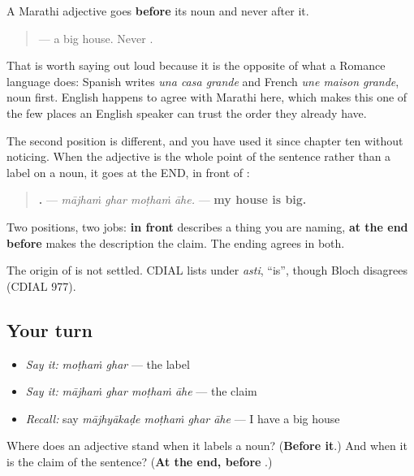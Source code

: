 \begin{grammarlens}[title={Grammar Lens: in front, always}]
A Marathi adjective goes \textbf{before} its noun and never after it.

\begin{quote}
\textbf{ } — a big house. Never \emph{ }.
\end{quote}

That is worth saying out loud because it is the opposite of what a Romance language does: Spanish writes \emph{una casa grande} and French \emph{une maison grande}, noun first. English happens to agree with Marathi here, which makes this one of the few places an English speaker can trust the order they already have.

The second position is different, and you have used it since chapter ten without noticing. When the adjective is the whole point of the sentence rather than a label on a noun, it goes at the END, in front of \textbf{}:

\begin{quote}
\textbf{   .} — \emph{mājhaṁ ghar moṭhaṁ āhe.} — \textbf{my house is big.}
\end{quote}

Two positions, two jobs: \textbf{in front} describes a thing you are naming, \textbf{at the end before } makes the description the claim. The ending agrees in both.
\end{grammarlens}

\begin{cousinweb}
The origin of \textbf{} is not settled. \textbf{} CDIAL lists under \emph{asti}, \textquotedblleft{}is\textquotedblright{}, though Bloch disagrees (CDIAL 977).
\end{cousinweb}

\subsection*{Your turn}
\begin{itemize}
\raggedright
  \item \emph{Say it:} \emph{moṭhaṁ ghar} — the label
  \item \emph{Say it:} \emph{mājhaṁ ghar moṭhaṁ āhe} — the claim
  \item \emph{Recall:} say \emph{mājhyākaḍe moṭhaṁ ghar āhe} — I have a big house
\end{itemize}

\begin{tcolorbox}[breakable,colback=teal!4,colframe=teal!35!black,title={Before you move on}]
Where does an adjective stand when it labels a noun? (\textbf{Before it}.) And when it is the claim of the sentence? (\textbf{At the end, before }.)
\end{tcolorbox}
